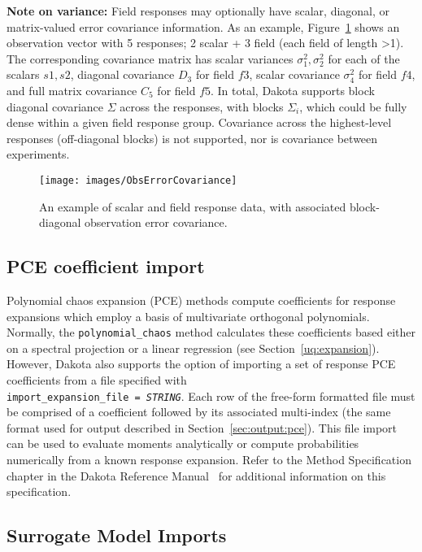 {\bf Note on variance:} Field responses may optionally have scalar,
diagonal, or matrix-valued error covariance information.  As an
example, Figure~\ref{fig:input:obs_err_cov} shows an observation
vector with 5 responses; 2 scalar + 3 field (each field of length
\textgreater 1).  The corresponding covariance matrix has scalar
variances $\sigma_1^2, \sigma_2^2$ for each of the scalars $s1, s2$,
diagonal covariance $D_3$ for field $f3$, scalar covariance
$\sigma_4^2$ for field $f4$, and full matrix covariance $C_5$ for
field $f5$.  In total, Dakota supports block diagonal covariance
$\Sigma$ across the responses, with blocks $\Sigma_i$, which could be
fully dense within a given field response group.  Covariance across
the highest-level responses (off-diagonal blocks) is not supported,
nor is covariance between experiments.
\begin{figure}[htbp!]
  \centering
  \texttt{[image: images/ObsErrorCovariance]}
  \caption{An example of scalar and field response data, with
    associated block-diagonal observation error covariance.}
  \label{fig:input:obs_err_cov}
\end{figure}

\subsection{PCE coefficient import}

Polynomial chaos expansion (PCE) methods compute coefficients for
response expansions which employ a basis of multivariate orthogonal
polynomials.  Normally, the \texttt{polynomial\_chaos} method
calculates these coefficients based either on a spectral projection or
a linear regression (see Section~\ref{uq:expansion}).  However, Dakota
also supports the option of importing a set of response PCE
coefficients from a file specified with \\
\texttt{import\_expansion\_file = \emph{STRING}}.  Each row of the
free-form formatted file must be comprised of a coefficient followed
by its associated multi-index (the same format used for output
described in Section~\ref{sec:output:pce}).  This file import can be
used to evaluate moments analytically or compute probabilities
numerically from a known response expansion.  Refer to the Method
Specification chapter in the Dakota Reference Manual~\cite{RefMan} for
additional information on this specification.

\subsection{Surrogate Model Imports}

